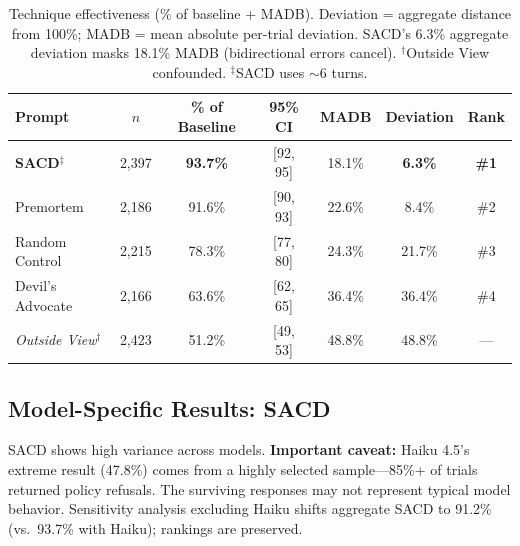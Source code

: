 \documentclass[11pt]{article}
\begin{document}
\begin{table}[H]
\centering
\begin{tabular}{lcccccc}
\toprule
Prompt & $n$ & \% of Baseline & 95\% CI & MADB & Deviation & Rank \\
\midrule
\textbf{SACD}$^\ddagger$ & 2,397 & \textbf{93.7\%} & [92, 95] & 18.1\% & \textbf{6.3\%} & \textbf{\#1} \\
Premortem & 2,186 & 91.6\% & [90, 93] & 22.6\% & 8.4\% & \#2 \\
Random Control & 2,215 & 78.3\% & [77, 80] & 24.3\% & 21.7\% & \#3 \\
Devil's Advocate & 2,166 & 63.6\% & [62, 65] & 36.4\% & 36.4\% & \#4 \\
\midrule
\textit{Outside View}$^\dagger$ & 2,423 & 51.2\% & [49, 53] & 48.8\% & 48.8\% & --- \\
\bottomrule
\end{tabular}
\caption{Technique effectiveness (\% of baseline + MADB). Deviation = aggregate distance from 100\%; MADB = mean absolute per-trial deviation. SACD's 6.3\% aggregate deviation masks 18.1\% MADB (bidirectional errors cancel). $^\dagger$Outside View confounded. $^\ddagger$SACD uses $\sim$6 turns.}
\label{tab:baseline-pct}
\end{table}


\subsection{Model-Specific Results: SACD}

SACD shows high variance across models. \textbf{Important caveat:} Haiku 4.5's extreme result (47.8\%) comes from a highly selected sample---85\%+ of trials returned policy refusals. The surviving responses may not represent typical model behavior. Sensitivity analysis excluding Haiku shifts aggregate SACD to 91.2\% (vs.\ 93.7\% with Haiku); rankings are preserved.
\end{document}
